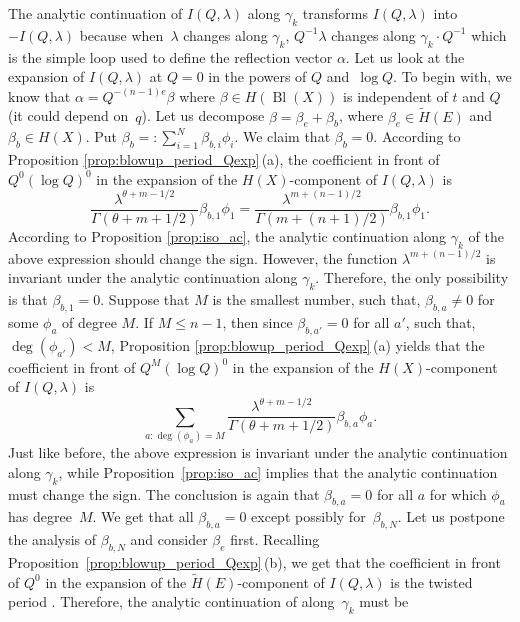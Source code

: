 \documentclass[10pt,a4paper]{article}
\numberwithin{equation}{section}
\newcommand{\leftexp}[2]{{\vphantom{#2}}^{#1}{#2}}
\begin{document}
The analytic continuation of $I(Q,\lambda)$ along $\gamma_k$ transforms $I(Q,\lambda)$ into $-I(Q,\lambda)$ because when~$\lambda$ changes along $\gamma_k$, $Q^{-1}\lambda$ changes along $\gamma_k\cdot Q^{-1}$ which is the simple loop used to define the reflection vector $\alpha$. Let us look at the expansion of $I(Q,\lambda)$ at $Q=0$ in the powers of $Q$ and~$\log Q$. To begin with, we know that $\alpha= Q^{-(n-1)e}\beta$ where $\beta\in H(\operatorname{Bl}(X))$ is independent of $t$ and $Q$ (it could depend on~$q$). Let us decompose $\beta=\beta_e+\beta_b$, where $\beta_e\in \widetilde{H}(E)$ and $\beta_b\in H(X)$. Put $\beta_b=:\sum_{i=1}^N \beta_{b,i} \phi_i$. We claim that $\beta_b=0$. According to Proposition \ref{prop:blowup_period_Qexp}\,(a), the coefficient in front of $Q^0(\log Q)^0$ in the expansion of the $H(X)$-component of $I(Q,\lambda)$ is
\[
\frac{\lambda^{\theta+m-1/2}}{\Gamma(\theta+m+1/2)} \beta_{b,1}\phi_1 =
\frac{\lambda^{m+(n-1)/2}}{\Gamma(m+(n+1)/2)} \beta_{b,1}\phi_1.
\]
According to Proposition \ref{prop:iso_ac}, the analytic continuation along $\gamma_k$ of the above expression should change the sign. However, the function $\lambda^{m+(n-1)/2}$ is invariant under the analytic continuation along $\gamma_k$. Therefore, the only possibility is that $\beta_{b,1}=0$. Suppose that $M$ is the smallest number, such that, $\beta_{b,a}\neq 0$ for some $\phi_a$ of degree $M$. If $M\leq n-1$, then since $\beta_{b,a'}=0$ for all $a'$, such that, $\operatorname{deg}(\phi_{a'})<M$, Proposition \ref{prop:blowup_period_Qexp}\,(a) yields that the coefficient in front of $Q^M (\log Q)^0$ in the expansion of the $H(X)$-component of $I(Q,\lambda)$ is
\[
\sum_{a: \operatorname{deg}(\phi_a)=M}
\frac{\lambda^{\theta+m-1/2}}{\Gamma(\theta+m+1/2)} \beta_{b,a}\phi_a.
\]
Just like before, the above expression is invariant under the analytic continuation along $\gamma_k$, while Proposition~\ref{prop:iso_ac} implies that the analytic continuation must change the sign. The conclusion is again that $\beta_{b,a}=0$ for all $a$ for which $\phi_a$ has degree~$M$. We get that all $\beta_{b,a}=0$ except possibly for~$\beta_{b,N}$. Let us postpone the analysis of $\beta_{b,N}$ and consider $\beta_{e}$ first. Recalling Proposition~\ref{prop:blowup_period_Qexp}\,(b), we get that the coefficient in front of $Q^0$ in the expansion of the $\widetilde{H}(E)$-component of $I(Q,\lambda)$ is the twisted period
\smash{$\leftexp{tw}{I}^{(-m)}_{\beta_e}(1,\lambda)$}.
Therefore, the analytic continuation of
\smash{$\leftexp{tw}{I}^{(-m)}_{\beta_e}(1,\lambda)$} along~$\gamma_k$ must be
\end{document}
